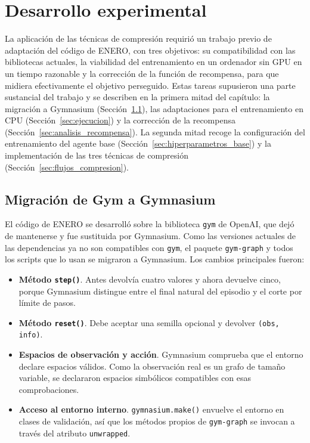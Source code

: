 \chapter{Desarrollo experimental}\label{cap:exp}

La aplicación de las técnicas de compresión requirió un trabajo previo de adaptación del código de ENERO, con tres objetivos: su compatibilidad con las bibliotecas actuales, la viabilidad del entrenamiento en un ordenador sin GPU en un tiempo razonable y la corrección de la función de recompensa, para que midiera efectivamente el objetivo perseguido. Estas tareas supusieron una parte sustancial del trabajo y se describen en la primera mitad del capítulo: la migración a Gymnasium (Sección~\ref{sec:migracion}), las adaptaciones para el entrenamiento en CPU (Sección~\ref{sec:ejecucion}) y la corrección de la recompensa (Sección~\ref{sec:analisis_recompensa}). La segunda mitad recoge la configuración del entrenamiento del agente base (Sección~\ref{sec:hiperparametros_base}) y la implementación de las tres técnicas de compresión (Sección~\ref{sec:flujos_compresion}).

\section{Migración de Gym a Gymnasium}\label{sec:migracion}

El código de ENERO se desarrolló sobre la biblioteca \texttt{gym} de OpenAI, que dejó de mantenerse y fue sustituida por Gymnasium. Como las versiones actuales de las dependencias ya no son compatibles con \texttt{gym}, el paquete \texttt{gym-graph} y todos los scripts que lo usan se migraron a Gymnasium. Los cambios principales fueron:

\begin{itemize}
	\item \textbf{Método \texttt{step()}}. Antes devolvía cuatro valores y ahora devuelve cinco, porque Gymnasium distingue entre el final natural del episodio y el corte por límite de pasos.
	\item \textbf{Método \texttt{reset()}}. Debe aceptar una semilla opcional y devolver \texttt{(obs, info)}.
	\item \textbf{Espacios de observación y acción}. Gymnasium comprueba que el entorno declare espacios válidos. Como la observación real es un grafo de tamaño variable, se declararon espacios simbólicos compatibles con esas comprobaciones.
	\item \textbf{Acceso al entorno interno}. \texttt{gymnasium.make()} envuelve el entorno en clases de validación, así que los métodos propios de \texttt{gym-graph} se invocan a través del atributo \texttt{unwrapped}.
\end{itemize}

